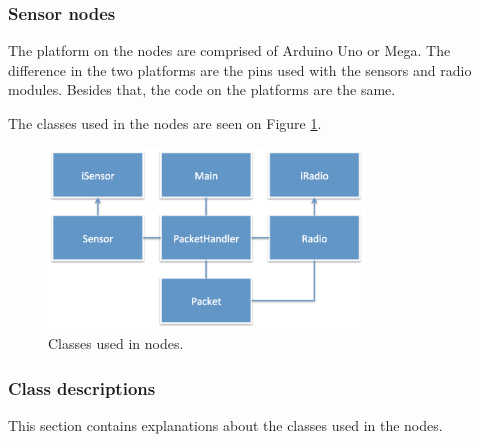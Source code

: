\subsubsection*{Sensor nodes}
The platform on the nodes are comprised of Arduino Uno or Mega. The difference in the two platforms are the pins used with the sensors and radio modules. Besides that, the code on the platforms are the same.

The classes used in the nodes are seen on Figure \ref{fig:nodeClass}.
\begin{figure}[h!]
\centering
\includegraphics[width=0.75\textwidth]{chapters/implementation/figures/nodeClass.png}
\caption{Classes used in nodes.}
\label{fig:nodeClass}
\end{figure}


\subsubsection*{Class descriptions}
This section contains explanations about the classes used in the nodes.

